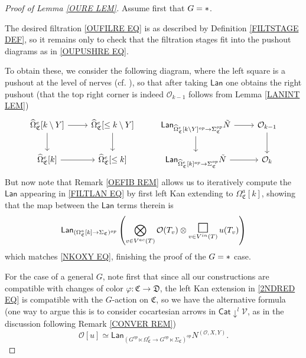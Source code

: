 \documentclass[a4paper,10pt
,draft
]{article}%
\numberwithin{equation}{section}
\numberwithin{figure}{section}
\theoremstyle{definition} %
\newcommand{\V}{\ensuremath{\mathcal V}}
\renewcommand{\O}{\ensuremath{\mathcal O}}
\newcommand{\1}{\ensuremath{\mathbbm 1}}%
\newcommand{\SC}{\Sigma_{\mathfrak C}}
\newcommand{\OC}{\Omega_{\mathfrak C}}
\begin{document}
\begin{proof}[Proof of Lemma \ref{OURE LEM}]
	Assume first that $G = \**$.
	
	The desired filtration \eqref{OUFILRE EQ} is as described by Definition \ref{FILTSTAGE DEF},
	so it remains only to check that the filtration stages
	fit into the pushout diagrams as in \eqref{OUPUSHRE EQ}.

To obtain these, we consider the following diagram, where the left square is a pushout at the level of nerves (cf. \cite[(5.65)]{BP_geo}),
so that after taking $\mathsf{Lan}$
one obtains the right pushout
(that the top right corner is indeed $\O_{k-1}$ follows from Lemma \ref{LANINT LEM})
\begin{equation}\label{FILTLAN EQ}
\begin{tikzcd}
\widehat\Omega_{\mathfrak C}^e[k \setminus Y] \arrow[r] \arrow[d]
&
\widehat\Omega_{\mathfrak C}^e[\leq k \setminus Y] \arrow[d]
&
\mathsf{Lan}_{\widehat\Omega_{\mathfrak C}^e[k \setminus Y]^{op} \to \SC^{op}} \tilde N \arrow[r] \arrow[d]
&
\O_{k-1} \arrow[d]
\\
\widehat\Omega_{\mathfrak C}^e[k] \arrow[r]
&
\widehat\Omega_{\mathfrak C}^e[\leq k]
&
\mathsf{Lan}_{\widehat \Omega_{\mathfrak C}^e[k]^{op} \to \SC^{op}} \tilde N \arrow[r]
&
\O_k
\end{tikzcd}
\end{equation}
But now note that Remark \ref{OEFIB REM}
allows us to iteratively compute the
$\mathsf{Lan}$
appearing in \eqref{FILTLAN EQ}
by first left Kan extending to 
$\Omega^a_{\mathfrak{C}}[k]$,
showing that the map between the $\mathsf{Lan}$ terms therein is
\begin{equation}\label{FILTLANFIN EQ}
	\mathsf{Lan}_{(\OC^a[k] \to \SC)^{op}}\left(
	\bigotimes_{v \in V^{ac}(T)}\O(T_v) \otimes
	\mathop{\mathlarger{\mathlarger{\mathlarger{\square}}}}\limits_{v \in V^{in}(T)} u(T_v)
	\right)
\end{equation}
which matches \eqref{NKOXY EQ}, finishing the proof of the 
$G = \**$ case.

For the case of a general $G$,
note first that since all our constructions 
are compatible with changes of color
$\varphi \colon \mathfrak{C} \to \mathfrak{D}$,
the left Kan extension in \eqref{2NDRED EQ}
is compatible with the $G$-action on $\mathfrak{C}$, 
so we have the alternative formula
(one way to argue this is 
to consider cocartesian arrows in 
$\mathsf{Cat} \downarrow^l \V$, 
as in the discussion following
Remark \ref{CONVER REM})
\begin{equation}\label{3RDRED EQ}
\O[u] \simeq
\mathsf{Lan}_{\left(G^{op} \ltimes \Omega_{\mathfrak C}^{e} 
	\to
G^{op} \ltimes \Sigma_{\mathfrak C}\right)^{op}} N^{(\O,X,Y)}.
\end{equation}


\end{proof}
\end{document}
